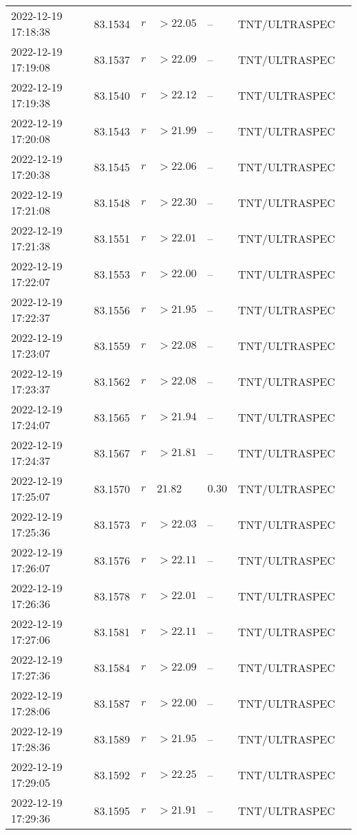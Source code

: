 \documentclass{nature_plusfigure}
\begin{document}
\begin{supplement}
\begin{center}
\begin{longtable}{lllllll}
2022-12-19 17:18:38 & 83.1534 & $r$ & $>22.05$ & -- & TNT/ULTRASPEC &  \\ 
2022-12-19 17:19:08 & 83.1537 & $r$ & $>22.09$ & -- & TNT/ULTRASPEC &  \\ 
2022-12-19 17:19:38 & 83.1540 & $r$ & $>22.12$ & -- & TNT/ULTRASPEC &  \\ 
2022-12-19 17:20:08 & 83.1543 & $r$ & $>21.99$ & -- & TNT/ULTRASPEC &  \\ 
2022-12-19 17:20:38 & 83.1545 & $r$ & $>22.06$ & -- & TNT/ULTRASPEC &  \\ 
2022-12-19 17:21:08 & 83.1548 & $r$ & $>22.30$ & -- & TNT/ULTRASPEC &  \\ 
2022-12-19 17:21:38 & 83.1551 & $r$ & $>22.01$ & -- & TNT/ULTRASPEC &  \\ 
2022-12-19 17:22:07 & 83.1553 & $r$ & $>22.00$ & -- & TNT/ULTRASPEC &  \\ 
2022-12-19 17:22:37 & 83.1556 & $r$ & $>21.95$ & -- & TNT/ULTRASPEC &  \\ 
2022-12-19 17:23:07 & 83.1559 & $r$ & $>22.08$ & -- & TNT/ULTRASPEC &  \\ 
2022-12-19 17:23:37 & 83.1562 & $r$ & $>22.08$ & -- & TNT/ULTRASPEC &  \\ 
2022-12-19 17:24:07 & 83.1565 & $r$ & $>21.94$ & -- & TNT/ULTRASPEC &  \\ 
2022-12-19 17:24:37 & 83.1567 & $r$ & $>21.81$ & -- & TNT/ULTRASPEC &  \\ 
2022-12-19 17:25:07 & 83.1570 & $r$ & $21.82$ & $0.30$ & TNT/ULTRASPEC &  \\ 
2022-12-19 17:25:36 & 83.1573 & $r$ & $>22.03$ & -- & TNT/ULTRASPEC &  \\ 
2022-12-19 17:26:07 & 83.1576 & $r$ & $>22.11$ & -- & TNT/ULTRASPEC &  \\ 
2022-12-19 17:26:36 & 83.1578 & $r$ & $>22.01$ & -- & TNT/ULTRASPEC &  \\ 
2022-12-19 17:27:06 & 83.1581 & $r$ & $>22.11$ & -- & TNT/ULTRASPEC &  \\ 
2022-12-19 17:27:36 & 83.1584 & $r$ & $>22.09$ & -- & TNT/ULTRASPEC &  \\ 
2022-12-19 17:28:06 & 83.1587 & $r$ & $>22.00$ & -- & TNT/ULTRASPEC &  \\ 
2022-12-19 17:28:36 & 83.1589 & $r$ & $>21.95$ & -- & TNT/ULTRASPEC &  \\ 
2022-12-19 17:29:05 & 83.1592 & $r$ & $>22.25$ & -- & TNT/ULTRASPEC &  \\ 
2022-12-19 17:29:36 & 83.1595 & $r$ & $>21.91$ & -- & TNT/ULTRASPEC &  \\ 

\end{longtable}
\end{center}
\end{supplement}
\end{document}
